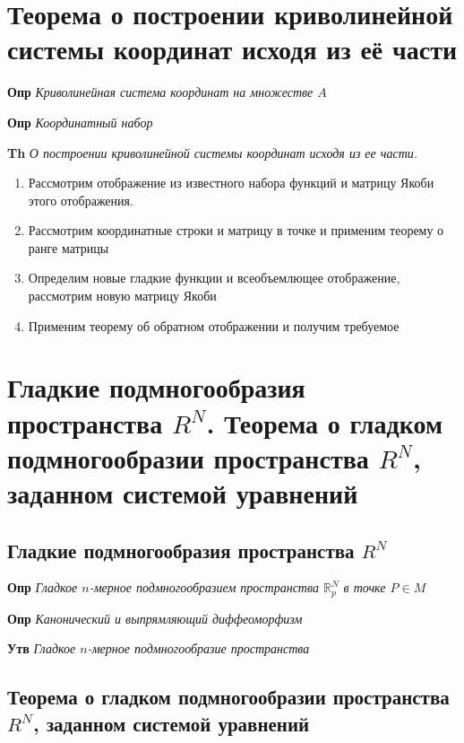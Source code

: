 \documentclass[a4paper, 14pt]{article}
\begin{document}
    \section{Теорема о построении криволинейной системы координат исходя из её части}
    
    \textbf{Опр} \textit{Криволинейная система координат на множестве $A$}
    
    \textbf{Опр} \textit{Координатный набор}
    
    \textbf{Th} \textit{О построении криволинейной системы координат исходя из ее части.}
    
    \begin{enumerate}
        \item Рассмотрим отображение из известного набора функций и матрицу Якоби этого отображения.
        \item Рассмотрим координатные строки и матрицу в точке и применим теорему о ранге матрицы
        \item Определим новые гладкие функции и всеобъемлющее отображение, рассмотрим новую матрицу Якоби
        \item Применим теорему об обратном отображении и получим требуемое
    \end{enumerate}
    
    \section{Гладкие подмногообразия пространства $R^N$.
    Теорема о гладком подмногообразии пространства $R^N$, заданном системой уравнений}
    
    \subsection{Гладкие подмногообразия пространства $R^N$}
    
    \textbf{Опр} \textit{Гладкое $n$-мерное подмногообразием пространства $\mathbb{R}^N_p$ в точке $P \in M$}
    
    \textbf{Опр} \textit{Канонический и выпрямляющий диффеоморфизм}
    
    \textbf{Утв} \textit{Гладкое $n$-мерное подмногообразие пространства}
    
    \subsection{Теорема о гладком подмногообразии пространства $R^N$, заданном системой уравнений}
    
\end{document}
